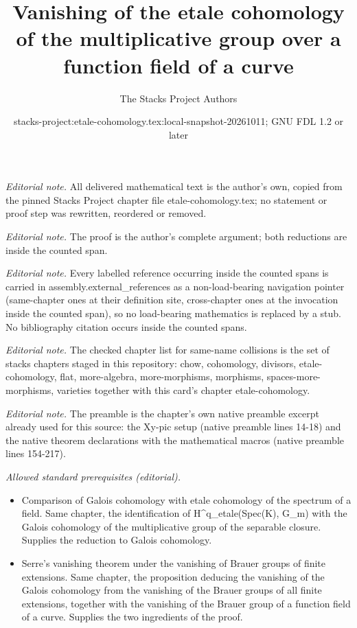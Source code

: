 \documentclass[10pt,a4paper]{amsart}
\title{Vanishing of the etale cohomology of the multiplicative group over a function field of a curve}
\author{The Stacks Project Authors}
\date{stacks-project:etale-cohomology.tex:local-snapshot-20261011; GNU FDL 1.2 or later}
\theoremstyle{plain}
\theoremstyle{definition}
\theoremstyle{remark}
\numberwithin{equation}{subsection}
\begin{document}
\maketitle
\noindent\textit{Editorial note.} All delivered mathematical text is the author's own, copied from the pinned Stacks Project chapter file etale-cohomology.tex; no statement or proof step was rewritten, reordered or removed.\par\medskip
\noindent\textit{Editorial note.} The proof is the author's complete argument; both reductions are inside the counted span.\par\medskip
\noindent\textit{Editorial note.} Every labelled reference occurring inside the counted spans is carried in assembly.external\_references as a non-load-bearing navigation pointer (same-chapter ones at their definition site, cross-chapter ones at the invocation inside the counted span), so no load-bearing mathematics is replaced by a stub. No bibliography citation occurs inside the counted spans.\par\medskip
\noindent\textit{Editorial note.} The checked chapter list for same-name collisions is the set of stacks chapters staged in this repository: chow, cohomology, divisors, etale-cohomology, flat, more-algebra, more-morphisms, morphisms, spaces-more-morphisms, varieties together with this card's chapter etale-cohomology.\par\medskip
\noindent\textit{Editorial note.} The preamble is the chapter's own native preamble excerpt already used for this source: the Xy-pic setup (native preamble lines 14-18) and the native theorem declarations with the mathematical macros (native preamble lines 154-217).\par\medskip
\noindent\textit{Allowed standard prerequisites (editorial).}\begin{itemize}
\item Comparison of Galois cohomology with etale cohomology of the spectrum of a field. Same chapter, the identification of H\textasciicircum{}q\_etale(Spec(K), G\_m) with the Galois cohomology of the multiplicative group of the separable closure. Supplies the reduction to Galois cohomology.
\item Serre's vanishing theorem under the vanishing of Brauer groups of finite extensions. Same chapter, the proposition deducing the vanishing of the Galois cohomology from the vanishing of the Brauer groups of all finite extensions, together with the vanishing of the Brauer group of a function field of a curve. Supplies the two ingredients of the proof.
\end{itemize}\medskip
\end{document}
